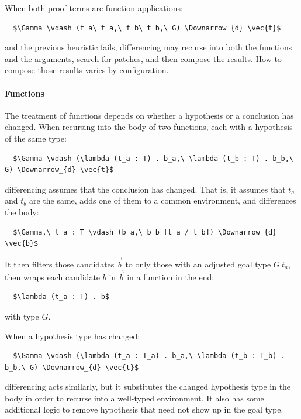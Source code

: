 When both proof terms are function applications:

\begin{lstlisting}
  $\Gamma \vdash (f_a\ t_a,\ f_b\ t_b,\ G) \Downarrow_{d} \vec{t}$
\end{lstlisting}
and the previous heuristic fails,
differencing may recurse into both the functions and the arguments, search for patches, and then compose the results.
How to compose those results varies by configuration.

\paragraph{Functions} %
The treatment of functions depends on whether a hypothesis or a conclusion has changed.
When recursing into the body of two functions, each with a hypothesis of the same type:

\begin{lstlisting}
  $\Gamma \vdash (\lambda (t_a : T) . b_a,\ \lambda (t_b : T) . b_b,\ G) \Downarrow_{d} \vec{t}$
\end{lstlisting}
differencing assumes that the conclusion has changed.
That is, it assumes that $t_a$ and $t_b$ are the same, adds one of them to a common environment,
and differences the body:

\begin{lstlisting}
  $\Gamma,\ t_a : T \vdash (b_a,\ b_b [t_a / t_b]) \Downarrow_{d} \vec{b}$
\end{lstlisting}
It then filters those candidates $\vec{b}$ to only those with an adjusted goal type $G\ t_a$,
then wraps each candidate $b$ in $\vec{b}$ in a function in the end:

\begin{lstlisting}
  $\lambda (t_a : T) . b$
\end{lstlisting}
with type $G$.

When a hypothesis type has changed:

\begin{lstlisting}
  $\Gamma \vdash (\lambda (t_a : T_a) . b_a,\ \lambda (t_b : T_b) . b_b,\ G) \Downarrow_{d} \vec{t}$
\end{lstlisting}
differencing acts similarly, but it substitutes the changed hypothesis type in the body in order to recurse into a well-typed environment.
It also has some additional logic to remove hypothesis that need not show up in the goal type.

